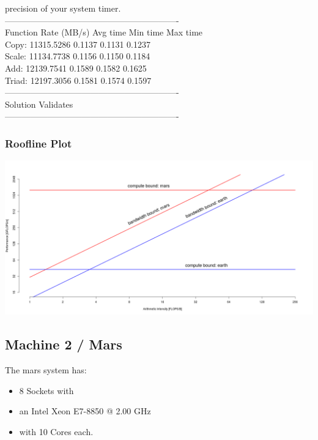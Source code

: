 \begin{itemize}
{		precision of your system timer. \\
		------------------------------------------------------------- \\
		Function      Rate (MB/s)   Avg time     Min time     Max time \\
		Copy:       11315.5286       0.1137       0.1131       0.1237 \\
		Scale:      11134.7738       0.1156       0.1150       0.1184 \\
		Add:        12139.7541       0.1589       0.1582       0.1625 \\
		Triad:      12197.3056       0.1581       0.1574       0.1597 \\
		------------------------------------------------------------- \\
		Solution Validates \\
		-------------------------------------------------------------
	}
	
	\newpage

\end{itemize}


\subsubsection{Roofline Plot}
\includegraphics[scale=0.4, angle=0]{figures/roofline-earth-mars-pure}


\subsection{Machine 2 / Mars}

The mars system has:
 \begin{itemize}
 	\item 8 Sockets with
	\item an Intel Xeon E7-8850 @ 2.00 GHz
	\item with 10 Cores each.
\end{itemize}

